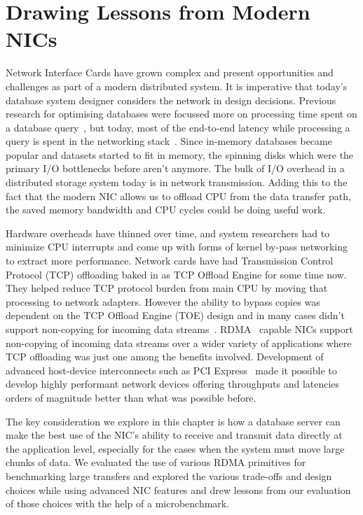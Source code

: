 \chapter{Drawing Lessons from Modern NICs}
\label{chap:modernnics}
Network Interface Cards have grown complex and present opportunities and \linebreak challenges as part of a modern distributed system.
 It is imperative that today’s database system designer considers the network in design decisions.
 Previous research for \linebreak optimising databases were focussed more on processing time spent on a database query~\cite{dbmsproctime},
  but today, most of the end-to-end latency while processing a query is spent in the \linebreak networking stack~\cite{ramcloudosr}.
Since in-memory databases became popular and datasets started to fit in memory, the spinning disks 
which were the primary I/O bottlenecks before aren't anymore. The bulk of I/O overhead in a distributed storage system today is in network transmission.
Adding this to the fact that the modern NIC allows us to offload CPU from the data transfer path,
the saved memory bandwidth and CPU cycles could be doing useful work.

Hardware overheads have thinned over time, and system researchers had to minimize CPU interrupts and come up with forms of kernel by-pass networking to extract more performance.
 Network cards have had Transmission Control Protocol (TCP) offloading baked in as TCP Offload Engine for some time now. They helped reduce TCP protocol burden from main CPU by moving that processing to network adapters.
 However the ability to bypass copies was dependent on the TCP Offload Engine (TOE) design and in \linebreak  many cases didn't support non-copying for incoming data streams~\cite{tcpoffload}. 
 \linebreak RDMA~\cite{rdmapatent,rdmacase,rdma} capable NICs support non-copying of incoming data streams over a wider variety of applications where TCP offloading was just one among the benefits \linebreak involved.
 Development of advanced host-device  interconnects such as PCI Express~\cite{pcie}  made it possible to develop highly performant network devices offering throughputs and latencies orders of magnitude better than what was possible before.

 The key consideration we explore in this chapter is how a database server can make the best use of the NIC's ability to receive and transmit data directly at the application level, especially for the
cases when the system must move large chunks of data. We evaluated
the use of various RDMA primitives for benchmarking large transfers and explored the various
 trade-offs and design choices while using advanced NIC features and drew lessons from our evaluation of those choices with the help of a microbenchmark. 

